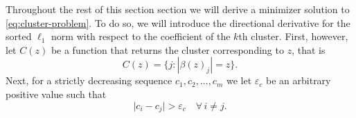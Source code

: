 
Throughout the rest of this section section we will derive a minimizer solution to
\eqref{eq:cluster-problem}. To do so, we will introduce the directional derivative for the
sorted \(\ell_1\) norm with respect to the coefficient of the \(k\)th cluster. First,
however, let \(C(z)\) be a function that returns the cluster corresponding to \(z\), that is
\[
  C(z) = \{j : |\beta(z)_j| = z\}.
\]
Next, for a  strictly decreasing sequence \(c_1, c_2, ..., c_m\) we let $\varepsilon_c$ be an arbitrary positive value such that 
\begin{equation}
  \label{eq:epsilon-c}
  \big| c_i - c_j\big| > {\varepsilon_c} \quad \forall\, i \neq j.
\end{equation}

